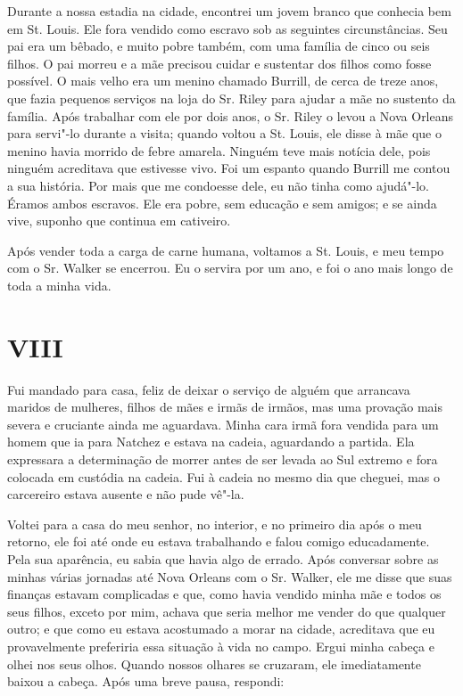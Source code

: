 Durante a nossa estadia na cidade, encontrei um jovem branco que
conhecia bem em St. Louis. Ele fora vendido como escravo sob as
seguintes circunstâncias. Seu pai era um bêbado, e muito pobre também,
com uma família de cinco ou seis filhos. O pai morreu e a mãe precisou
cuidar e sustentar dos filhos como fosse possível. O mais velho era um
menino chamado Burrill, de cerca de treze anos, que fazia pequenos
serviços na loja do Sr. Riley para ajudar a mãe no sustento da família.
Após trabalhar com ele por dois anos, o Sr. Riley o levou a Nova Orleans
para servi"-lo durante a visita; quando voltou a St. Louis, ele disse à
mãe que o menino havia morrido de febre amarela. Ninguém teve mais
notícia dele, pois ninguém acreditava que estivesse vivo. Foi um espanto
quando Burrill me contou a sua história. Por mais que me condoesse dele,
eu não tinha como ajudá"-lo. Éramos ambos escravos. Ele era pobre, sem
educação e sem amigos; e se ainda vive, suponho que continua em
cativeiro.

Após vender toda a carga de carne humana, voltamos a St. Louis, e meu
tempo com o Sr. Walker se encerrou. Eu o servira por um ano, e foi o ano
mais longo de toda a minha vida.

\chapter{VIII}

Fui mandado para casa, feliz de deixar o serviço de alguém que arrancava
maridos de mulheres, filhos de mães e irmãs de irmãos, mas uma provação
mais severa e cruciante ainda me aguardava. Minha cara irmã fora vendida
para um homem que ia para Natchez e estava na cadeia, aguardando a
partida. Ela expressara a determinação de morrer antes de ser levada ao
Sul extremo e fora colocada em custódia na cadeia. Fui à cadeia no mesmo
dia que cheguei, mas o carcereiro estava ausente e não pude vê"-la.

Voltei para a casa do meu senhor, no interior, e no primeiro dia após o
meu retorno, ele foi até onde eu estava trabalhando e falou comigo
educadamente. Pela sua aparência, eu sabia que havia algo de errado.
Após conversar sobre as minhas várias jornadas até Nova Orleans com o
Sr. Walker, ele me disse que suas finanças estavam complicadas e que,
como havia vendido minha mãe e todos os seus filhos, exceto por mim,
achava que seria melhor me vender do que qualquer outro; e que como eu
estava acostumado a morar na cidade, acreditava que eu provavelmente
preferiria essa situação à vida no campo. Ergui minha cabeça e olhei nos
seus olhos. Quando nossos olhares se cruzaram, ele imediatamente baixou
a cabeça. Após uma breve pausa, respondi:

